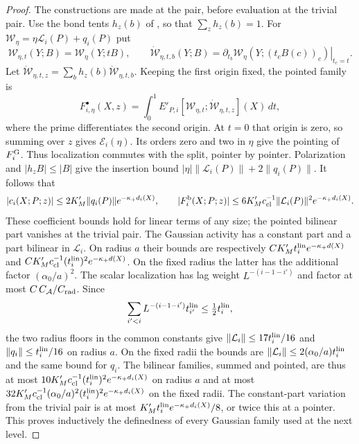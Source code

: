 \documentclass[11pt,letterpaper,reqno]{amsart}
\theoremstyle{definition}
\theoremstyle{remark}
\begin{document}
\begin{proof}
The constructions are made at the pair, before evaluation at the
trivial pair. Use the bond tents $h_z(b)$ of
\cite[Equation~(760)]{YMM1}, so that $\sum_zh_z(b)=1$.
For $\mathcal W_\eta=\eta\mathcal L_i(P)+q_i(P)$ put
\[
 \mathcal W_{\eta,t}(Y;B)=\mathcal W_\eta(Y;tB),\qquad
 \dot{\mathcal W}_{\eta,t,b}(Y;B)=
 \left.\partial_{t_b}\mathcal W_\eta(Y;(t_cB(c))_c)\right|_{t_c=t}.
\]
Let $\dot{\mathcal W}_{\eta,t,z}=\sum_bh_z(b)\dot{\mathcal W}_{\eta,t,b}$.
Keeping the first origin fixed, the pointed family is
\[
 F_{i,\eta}^\bullet(X,z)=\int_0^1
 E'_{P,i}[\mathcal W_{\eta,t};\dot{\mathcal W}_{\eta,t,z}](X)\,dt,
\]
where the prime differentiates the second origin. At $t=0$ that
origin is zero, so summing over $z$ gives $\mathcal E_i(\eta)$.
Its orders zero and two in $\eta$ give the pointing of $F_i^{\rm G}$.
Thus localization commutes with the split, pointer by pointer.
Polarization and $|h_zB|\le|B|$ give the insertion bound
$|\eta|\|\mathcal L_i(P)\|+2\|q_i(P)\|$. It follows that
\[
 |c_i(X;P;z)|\le2K'_M\|q_i(P)\|e^{-\kappa_+d_i(X)},\qquad
 |F_i^{\rm b}(X;P;z)|\le6K'_Mc_{\rm cl}^{-1}
                  \|\mathcal L_i(P)\|^2e^{-\kappa_+d_i(X)}.
\]
These coefficient bounds hold for linear terms of any size;
the pointed bilinear part vanishes at the trivial pair.
The Gaussian activity has a constant part and a part bilinear in
$\mathcal L_i$. On radius $a$ their bounds are respectively
$C K'_M t_i^{\rm lin} e^{-\kappa_+d(X)}$ and
$C K'_M c_{\rm cl}^{-1}(t_i^{\rm lin})^2e^{-\kappa_+d(X)}$.
On the fixed radius the latter has the additional factor
$(\alpha_0/a)^2$. The scalar localization has lag weight
$L^{-(i-1-i')}$ and factor at most
$C\,C_{\mathcal A}/C_{\rm rad}$. Since
\[
 \sum_{i'<i}L^{-(i-1-i')}t_{i'}^{\rm lin}\le\tfrac12t_i^{\rm lin},
\]
the two radius floors in the common constants give
$\|\mathcal L_i\|\le17t_i^{\rm lin}/16$ and
$\|q_i\|\le t_i^{\rm lin}/16$ on radius $a$.
On the fixed radii the bounds are
$\|\mathcal L_i\|\le2(\alpha_0/a)t_i^{\rm lin}$ and the
same bound for $q_i$. The bilinear families, summed and
pointed, are thus at most
$10K'_Mc_{\rm cl}^{-1}(t_i^{\rm lin})^2e^{-\kappa_+d_i(X)}$
on radius $a$ and at most
$32K'_Mc_{\rm cl}^{-1}(\alpha_0/a)^2(t_i^{\rm lin})^2
e^{-\kappa_+d_i(X)}$ on the fixed radii. The constant-part
variation from the trivial pair is at most
$K'_Mt_i^{\rm lin}e^{-\kappa_+d_i(X)}/8$, or twice this
at a pointer. This proves inductively the definedness of
every Gaussian family used at the next level.


\end{proof}
\end{document}
